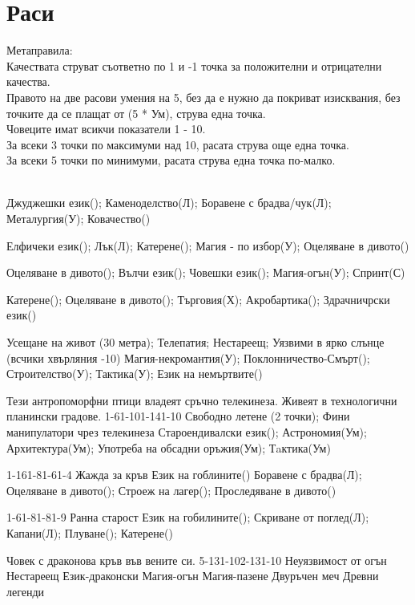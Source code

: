 \section{Раси}
Метаправила:  \\
Качествата струват съответно по 1 и -1 точка за положителни и отрицателни качества.  \\
Правото на две расови умения на 5, без да е нужно да покриват изисквания, без точките да се плащат от (5 * Ум), струва една точка.  \\
Човеците имат всикчи показатели 1 - 10.  \\
За всеки 3 точки по максимуми над 10, расата струва още една точка.  \\
За всеки 5 точки по минимуми, расата струва една точка по-малко.  \\
\\
\begin{multicols}{2}

{
Джуджешки език();
Каменоделство(Л);
Боравене с брадва/чук(Л);
Металургия(У);
Ковачество()
}

{
Елфичеки език();
Лък(Л);
Катерене();
Магия - по избор(У);
Оцеляване в дивото()
}

{
Оцеляване в дивото();
Вълчи език();
Човешки език();
Магия-огън(У);
Спринт(С)
}

{
Катерене();
Оцеляване в дивото();
Търговия(Х);
Акробартика();
Здрачничрски език()
}

{
Усещане на живот (30 метра);
Телепатия;
Нестареещ;
Уязвими в ярко слънце (всчики хвърляния -10)
}
{
Магия-некромантия(У);
Поклонничество-Смърт();
Строителство(У);
Тактика(У);
Език на немъртвите()
}

{Тези антропоморфни птици владеят сръчно телекинеза. Живеят в технологични планински градове.}
{1-6}{1-10}{1-14}{1-10}
{
Свободно летене (2 точки);
Фини манипулатори чрез телекинеза
}
{
Староендивалски език();
Астрономия(Ум);
Архитектура(Ум);
Употреба на обсадни оръжия(Ум);
Тaктика(Ум)
}

{}
{1-16}{1-8}{1-6}{1-4}
{
Жажда за кръв
}
{
Език на гоблините()
Боравене с брадва(Л);
Оцеляване в дивото();
Строеж на лагер();
Проследяване в дивото()
}

{}
{1-6}{1-8}{1-8}{1-9}
{
Ранна старост
}
{
Език на гобилините();
Скриване от поглед(Л);
Капани(Л);
Плуване();
Катерене()
}

{Човек с драконова кръв във вените си.}
{5-13}{1-10}{2-13}{1-10}
{
Неуязвимост от огън
Нестареещ
}
{
Език-драконски
Магия-огън
Магия-пазене
Двуръчен меч
Древни легенди
}

\end{multicols}
